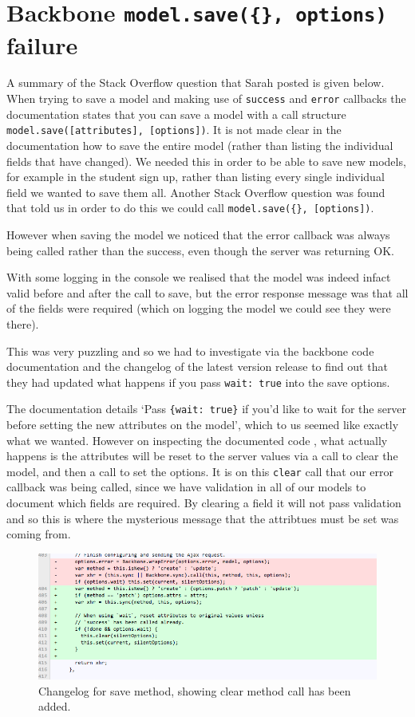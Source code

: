\section{Backbone \texttt{model.save(\{\}, options)} failure}
A summary of the Stack Overflow question\cite{so_model_save} that Sarah posted is given below.
When trying to save a model and making use of \verb!success! and \verb!error! callbacks the documentation states that you can save a model with a call structure \verb!model.save([attributes], [options])!. 
It is not made clear in the documentation how to save the entire model (rather than listing the individual fields that have changed). We needed this in order to be able to save new models, for example in the student sign up, rather than listing every single individual field we wanted to save them all.
Another Stack Overflow question\cite{so_save_all_fields} was found that told us in order to do this we could call \verb!model.save({}, [options])!.

However when saving the model we noticed that the error callback was always being called rather than the success, even though the server was returning OK.

With some logging in the console we realised that the model was indeed infact valid before and after the call to save, but the error response message was that all of the fields were required (which on logging the model we could see they were there).

This was very puzzling and so we had to investigate via the backbone code documentation\cite{backbone_code} and the changelog of the latest version release\cite{backbone_change_log} to find out that they had updated what happens if you pass \verb!wait: true! into the save options.

The documentation details `Pass \verb!{wait: true}! if you'd like to wait for the server before setting the new attributes on the model', which to us seemed like exactly what we wanted. 
However on inspecting the documented code , what actually happens is the attributes will be reset to the server values via a call to clear the model, and then a call to set the options.
It is on this \verb!clear! call that our error callback was being called, since we have validation in all of our models
to document which fields are required. By clearing a field it will not pass validation and so this is where the mysterious message that the attribtues must be set was coming from.

\begin{figure}[H]\centering
\includegraphics[scale=0.5]{images/appendix/backbone_changelog}
\caption{Changelog for save method, showing clear method call has been added.}
\end{figure}

